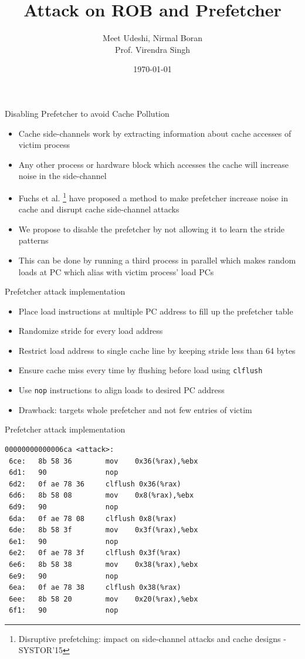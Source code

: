 \documentclass[10pt]{beamer}
\title[DDP]{Attack on ROB and Prefetcher} %
\author{Meet Udeshi, Nirmal Boran\\
Prof. Virendra Singh} %
\institute[CADSL] %
{
CADSL - IIT Bombay\\ %
}
\date{\today} %
\begin{document}
\begin{frame}
    \titlepage %
\end{frame}

\begin{frame}{Disabling Prefetcher to avoid Cache Pollution}
    \begin{itemize}
        \item Cache side-channels work by extracting information about cache accesses of victim process
        \item Any other process or hardware block which accesses the cache will increase noise in the side-channel
        \item Fuchs et al. \footnote{Disruptive prefetching: impact on side-channel attacks and cache designs - SYSTOR'15} have proposed a method to make prefetcher increase noise in cache and disrupt cache side-channel attacks
        \item We propose to disable the prefetcher by not allowing it to learn the stride patterns
        \item This can be done by running a third process in parallel which makes random loads at PC which alias with victim process' load PCs
    \end{itemize}
\end{frame}

\begin{frame}{Prefetcher attack implementation}
    \begin{itemize}
        \item Place load instructions at multiple PC address to fill up the prefetcher table
        \item Randomize stride for every load address
        \item Restrict load address to single cache line by keeping stride less than 64 bytes
        \item Ensure cache miss every time by flushing before load using \texttt{clflush}
        \item Use \texttt{nop} instructions to align loads to desired PC address
        \vspace{2em}
        \item Drawback: targets whole prefetcher and not few entries of victim
    \end{itemize}
\end{frame}

\begin{frame}[fragile]{Prefetcher attack implementation}
    \begin{lstlisting}
00000000000006ca <attack>:
 6ce:   8b 58 36        mov    0x36(%rax),%ebx
 6d1:   90              nop
 6d2:   0f ae 78 36     clflush 0x36(%rax)
 6d6:   8b 58 08        mov    0x8(%rax),%ebx
 6d9:   90              nop
 6da:   0f ae 78 08     clflush 0x8(%rax)
 6de:   8b 58 3f        mov    0x3f(%rax),%ebx
 6e1:   90              nop
 6e2:   0f ae 78 3f     clflush 0x3f(%rax)
 6e6:   8b 58 38        mov    0x38(%rax),%ebx
 6e9:   90              nop
 6ea:   0f ae 78 38     clflush 0x38(%rax)
 6ee:   8b 58 20        mov    0x20(%rax),%ebx
 6f1:   90              nop
    \end{lstlisting}
\end{frame}
\end{document}
